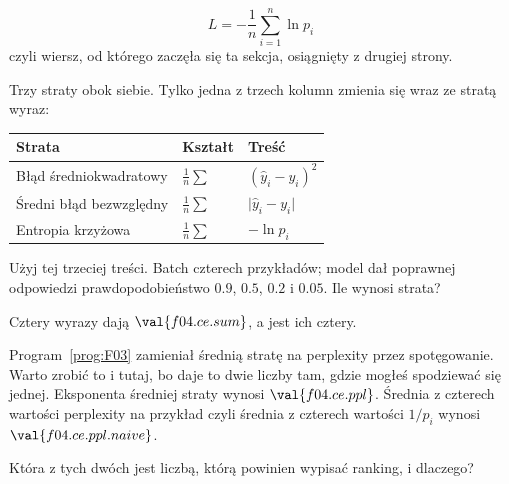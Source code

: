 \begin{fr}
\begin{ansblock}
\[ L = -\frac{1}{n}\sum_{i=1}^{n} \ln p_i \]
czyli wiersz, od którego zaczęła się ta sekcja, osiągnięty z drugiej strony.
\end{ansblock}

Trzy straty obok siebie. Tylko jedna z trzech kolumn zmienia się wraz ze
stratą \dash{} wyraz:

\begin{center}
\begin{tabular}{lll}
\toprule
Strata & Kształt & Treść \\
\midrule
Błąd średniokwadratowy & $\frac{1}{n}\sum$ & $(\hat{y}_i - y_i)^{2}$ \\
Średni błąd bezwzględny & $\frac{1}{n}\sum$ & $\lvert \hat{y}_i - y_i \rvert$ \\
Entropia krzyżowa & $\frac{1}{n}\sum$ & $-\ln p_i$ \\
\bottomrule
\end{tabular}
\end{center}

Użyj tej trzeciej treści. Batch czterech przykładów; model dał poprawnej
odpowiedzi prawdopodobieństwo $\num{0.9}$, $\num{0.5}$, $\num{0.2}$ i
$\num{0.05}$. Ile wynosi strata?
\dotline
\nextframe
\end{fr}

\begin{fr}
Cztery wyrazy dają $\val{f04.ce.sum}$, a jest ich cztery.

Program~\ref{prog:F03} zamieniał średnią stratę na perplexity przez
spotęgowanie. Warto zrobić to i tutaj, bo daje to dwie liczby tam, gdzie
mogłeś spodziewać się jednej. Eksponenta średniej straty wynosi
$\val{f04.ce.ppl}$. Średnia z czterech wartości perplexity na przykład
\dash{} czyli średnia z czterech wartości $1/p_i$ \dash{} wynosi
$\val{f04.ce.ppl.naive}$.

Która z tych dwóch jest liczbą, którą powinien wypisać ranking, i dlaczego?
\nextframe
\end{fr}

